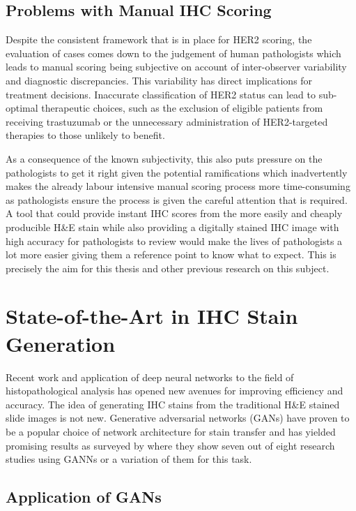 \subsection{{Problems with Manual IHC Scoring}}

Despite the consistent framework that is in place for HER2 scoring, the evaluation of cases comes down to the judgement of human pathologists which leads to manual scoring being subjective on account of inter-observer variability and diagnostic discrepancies. This variability has direct implications for treatment decisions. Inaccurate classification of HER2 status can lead to sub-optimal therapeutic choices, such as the exclusion of eligible patients from receiving trastuzumab or the unnecessary administration of HER2-targeted therapies to those unlikely to benefit.

As a consequence of the known subjectivity, this also puts pressure on the pathologists to get it right given the potential ramifications which inadvertently makes the already labour intensive manual scoring process more time-consuming as pathologists ensure the process is given the careful attention that is required. A tool that could provide instant IHC scores from the more easily and cheaply producible H\&E stain while also providing a digitally stained IHC image with high accuracy for pathologists to review would make the lives of pathologists a lot more easier giving them a reference point to know what to expect. This is precisely the aim for this thesis and other previous research on this subject.

\section{State-of-the-Art in IHC Stain Generation}

Recent work and application of deep neural networks to the field of histopathological analysis has opened new avenues for improving efficiency and accuracy. The idea of generating IHC stains from the traditional H\&E stained slide images is not new. Generative adversarial networks (GANs) have proven to be a popular choice of network architecture for stain transfer and has yielded promising results as surveyed by \textcite{Srinidhi2021DeepSurvey} where they show seven out of eight research studies using GANNs or a variation of them for this task.

\subsection{Application of GANs}

